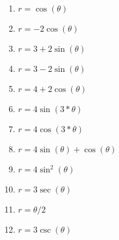 \documentclass[11pt]{exam}
\begin{document}
\vspace{2ex}
\begin{multicols}{3}
	\begin{enumerate}
		\item $r = \cos(\theta)$
		\item $r = -2 \cos(\theta)$
		\item $r = 3+2\sin(\theta)$
		\item $r = 3-2\sin(\theta)$
		\item $r=4+2\cos(\theta)$
		\item $r=4\sin(3*\theta)$
		\item $r=4\cos(3*\theta)$
		\item $r=4\sin(\theta)+\cos(\theta)$
		\item $r=4\sin^2(\theta)$
		\item $r = 3\sec(\theta)$
		\item $r = \theta/2$
		\item $r = 3\csc(\theta)$
	\end{enumerate}
	\end{multicols}
\clearpage
\end{document}
